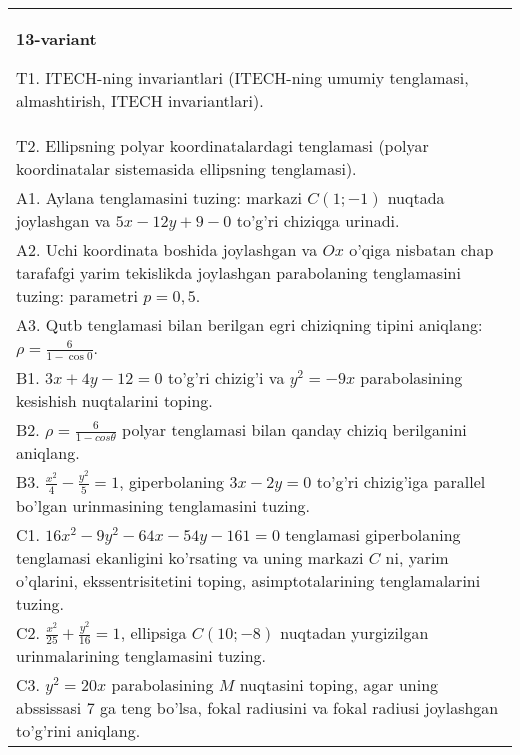 \documentclass{article}
\begin{document}
\begin{tabular}{m{17cm}}
\textbf{13-variant}
\newline

T1. ITECH-ning invariantlari (ITECH-ning umumiy tenglamasi, almashtirish, ITECH invariantlari).\\

T2. Ellipsning polyar koordinatalardagi tenglamasi (polyar koordinatalar sistemasida ellipsning tenglamasi).\\

A1. Aylana tenglamasini tuzing: markazi $C(1;-1)$ nuqtada joylashgan va $5x-12y+9-0$ to'g'ri chiziqga urinadi.\\

A2. Uchi koordinata boshida joylashgan va $Ox$ o'qiga nisbatan chap tarafafgi yarim tekislikda joylashgan parabolaning tenglamasini tuzing: parametri $p=0,5$.\\

A3. Qutb tenglamasi bilan berilgan egri chiziqning tipini aniqlang: $\rho=\frac{6}{1-\cos 0}$.\\

B1. $3x + 4y - 12 = 0$ to'g'ri chizig'i va $y^{2} = - 9x$ parabolasining kesishish nuqtalarini toping.\\

B2. $\rho = \frac{6}{1 - cos\theta}$ polyar tenglamasi bilan qanday chiziq berilganini aniqlang.  \\

B3. $\frac{x^{2}}{4} - \frac{y^{2}}{5} = 1$, giperbolaning $3x - 2y = 0$ to'g'ri chizig'iga parallel bo'lgan urinmasining tenglamasini tuzing.  \\

C1. $16x^{2} - 9y^{2} - 64x - 54y - 161 = 0$ tenglamasi giperbolaning tenglamasi ekanligini ko'rsating va uning markazi $C$ ni, yarim o'qlarini, ekssentrisitetini toping, asimptotalarining tenglamalarini tuzing.  \\

C2. $\frac{x^{2}}{25} + \frac{y^{2}}{16} = 1$, ellipsiga $C(10; - 8)$ nuqtadan yurgizilgan urinmalarining tenglamasini tuzing.  \\

C3. $y^{2} = 20x$ parabolasining $M$ nuqtasini toping, agar uning abssissasi 7 ga teng bo'lsa, fokal radiusini va fokal radiusi joylashgan to'g'rini aniqlang.\\

\end{tabular}
\vspace{1cm}
\end{document}
